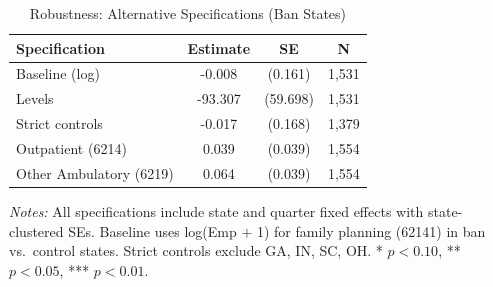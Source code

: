 \begin{table}[H]
\centering
\caption{Robustness: Alternative Specifications (Ban States)}
\label{tab:robustness}
\begin{threeparttable}
\begin{tabular}{lccc}
\toprule
Specification & Estimate & SE & N \\
\midrule
Baseline (log) & -0.008 & (0.161) & 1,531 \\
Levels & -93.307 & (59.698) & 1,531 \\
Strict controls & -0.017 & (0.168) & 1,379 \\
Outpatient (6214) & 0.039 & (0.039) & 1,554 \\
Other Ambulatory (6219) & 0.064 & (0.039) & 1,554 \\
\bottomrule
\end{tabular}
\begin{tablenotes}[flushleft]
\small
\item \textit{Notes:} All specifications include state and quarter fixed effects with state-clustered SEs. Baseline uses log(Emp $+$ 1) for family planning (62141) in ban vs.\ control states. Strict controls exclude GA, IN, SC, OH. * $p<0.10$, ** $p<0.05$, *** $p<0.01$.
\end{tablenotes}
\end{threeparttable}
\end{table}

